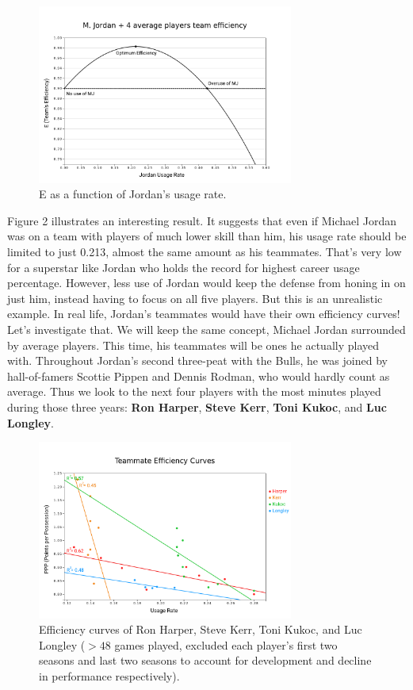 \documentclass{article}
\begin{document}
\begin{figure}[H]
\centering
\includegraphics[width=0.75\textwidth]{team1.png}
\caption{E as a function of Jordan's usage rate.}
\end{figure}
Figure 2 illustrates an interesting result. It suggests that even if Michael Jordan was on a team with players of much lower skill than him, his usage rate should be limited to just 0.213, almost the same amount as his teammates. That's very low for a superstar like Jordan who holds the record for highest career usage percentage. However, less use of Jordan would keep the defense from honing in on just him, instead having to focus on all five players. But this is an unrealistic example. In real life, Jordan's teammates would have their own efficiency curves! Let's investigate that.
\newline We will keep the same concept, Michael Jordan surrounded by average players. This time, his teammates will be ones he actually played with. Throughout Jordan's second three-peat with the Bulls, he was joined by hall-of-famers Scottie Pippen and Dennis Rodman, who would hardly count as average. Thus we look to the next four players with the most minutes played during those three years: \textbf{Ron Harper}, \textbf{Steve Kerr}, \textbf{Toni Kukoc}, and \textbf{Luc Longley}.
\begin{figure}[H]
\centering
\includegraphics[width=0.75\textwidth]{harper.png}
\caption{Efficiency curves of Ron Harper, Steve Kerr, Toni Kukoc, and Luc Longley ($>48$ games played, excluded each player's first two seasons and last two seasons to account for development and decline in performance respectively).}
\end{figure}
\end{document}
